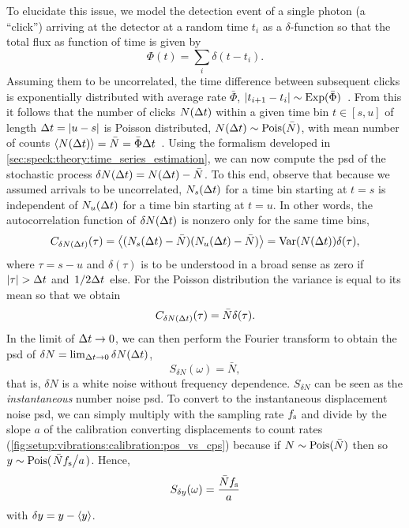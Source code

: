 To elucidate this issue, we model the detection event of a single photon (a \enquote{click}) arriving at the detector at a random time $t_i$ as a $\delta$-function so that the total flux as function of time is given by
\begin{equation}\label{eq:setup:flux_comb}
    \Phi(t) = \sum_i \delta(t-t_i).
\end{equation}
Assuming them to be uncorrelated, the time difference between subsequent clicks is exponentially distributed with average rate $\bar{\Phi}$, $\lvert t_{i+1}-t_i\rvert\sim\operatorname{Exp}(\bar{\Phi})$~\cite{ExponentialDistributionWiki}.
From this it follows that the number of clicks $N(\Delta t)$ within a given time bin $t\in [s, u]$ of length $\Delta t = \lvert u - s\rvert$ is Poisson distributed, $N(\Delta t)\sim\operatorname{Pois}(\bar{N})$, with mean number of counts $\expval{N(\ensuremath{\Delta t})} = \bar{N} = \bar{\Phi}\Delta t$~\cite{PoissonDistributionWiki}.
Using the formalism developed in \cref{sec:speck:theory:time_series_estimation}, we can now compute the \gls{psd} of the stochastic process $\delta N(\Delta t) = N(\Delta t) - \bar{N}$.
To this end, observe that because we assumed arrivals to be uncorrelated, $N_s(\Delta t)$ for a time bin starting at $t=s$ is independent of $N_u(\Delta t)$ for a time bin starting at $t=u$.
In other words, the autocorrelation function of $\delta N(\Delta t)$ is nonzero only for the same time bins,
\begin{equation}\label{eq:setup:poisson:autocorrelation}
    C_{\delta N(\Delta t)}(\tau) = \expval{(N_s(\ensuremath{\Delta t}) - \bar{N})(N_u(\ensuremath{\Delta t}) - \bar{N})} = \operatorname{Var}(N(\Delta t))\delta(\tau),
\end{equation}
where $\tau = s-u$ and $\delta(\tau)$ is to be understood in a broad sense as zero if $\abs{\tau} > \Delta t$ and $\flatfrac{1}{2\dt}$ else.
For the Poisson distribution the variance is equal to its mean so that we obtain
\begin{equation}\label{eq:setup:poisson:autocorrelation:evaluated}
    C_{\delta N(\Delta t)}(\tau) = \bar{N}\delta(\tau).
\end{equation}
In the limit of $\Delta t\to 0$, we can then perform the Fourier transform to obtain the \gls{psd} of $\delta N = \lim_{\Delta t\to 0}\delta N(\Delta t)$,
\begin{equation}\label{eq:setup:poisson:psd}
    S_{\delta N}(\omega) = \bar{N},
\end{equation}
that is, $\delta N$ is a white noise without frequency dependence.
$S_{\delta N}$ can be seen as the \emph{instantaneous} number noise \gls{psd}.
To convert to the instantaneous displacement noise \gls{psd}, we can simply multiply with the sampling rate $f_{\mathrm{s}}$ and divide by the slope $a$ of the calibration converting displacements to count rates (\cref{fig:setup:vibrations:calibration:pos_vs_cps}) because if $N\sim\operatorname{Pois}(\bar{N})$ then so $y\sim\poisson(\flatfrac{\bar{N}\fs}{a})$.
Hence,
\begin{equation}\label{eq:setup:poisson:psd:displ}
    S_{\delta y}(\omega) = \frac{\bar{N}f_{\mathrm{s}}}{a}
\end{equation}
with $\delta y = y - \expval{y}$.

